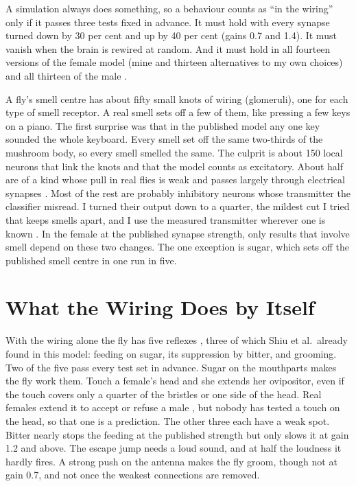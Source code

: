 A simulation always does something, so a behaviour counts as ``in the wiring'' only if it passes three tests fixed in advance. It must hold with every synapse turned down by 30 per cent and up by 40 per cent (gains 0.7 and 1.4). It must vanish when the brain is rewired at random. And it must hold in all fourteen versions of the female model (mine and thirteen alternatives to my own choices) and all thirteen of the male .

A fly's smell centre has about fifty small knots of wiring (glomeruli), one for each type of smell receptor. A real smell sets off a few of them, like pressing a few keys on a piano. The first surprise was that in the published model any one key sounded the whole keyboard. Every smell set off the same two-thirds of the mushroom body, so every smell smelled the same. The culprit is about 150 local neurons that link the knots and that the model counts as excitatory. About half are of a kind whose pull in real flies is weak and passes largely through electrical synapses \citep{yaksi2010electrical}. Most of the rest are probably inhibitory neurons whose transmitter the classifier misread. I turned their output down to a quarter, the mildest cut I tried that keeps smells apart, and I use the measured transmitter wherever one is known . In the female at the published synapse strength, only results that involve smell depend on these two changes. The one exception is sugar, which sets off the published smell centre in one run in five.

\section{What the Wiring Does by Itself}
\label{sec:reflexes}

With the wiring alone the fly has five reflexes , three of which Shiu et al.\ already found in this model: feeding on sugar, its suppression by bitter, and grooming. Two of the five pass every test set in advance. Sugar on the mouthparts makes the fly work them. Touch a female's head and she extends her ovipositor, even if the touch covers only a quarter of the bristles or one side of the head. Real females extend it to accept or refuse a male \citep{mezzera2020ovipositor}, but nobody has tested a touch on the head, so that one is a prediction. The other three each have a weak spot. Bitter nearly stops the feeding at the published strength but only slows it at gain 1.2 and above. The escape jump needs a loud sound, and at half the loudness it hardly fires. A strong push on the antenna makes the fly groom, though not at gain 0.7, and not once the weakest connections are removed.

